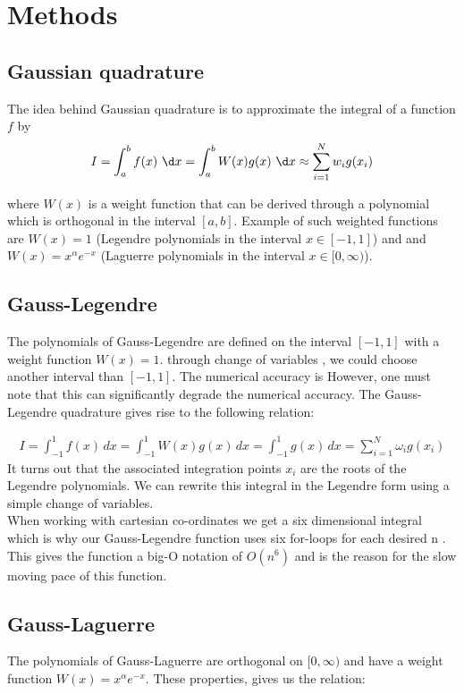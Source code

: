 \documentclass{article}
\begin{document}
\section{Methods}

\subsection{Gaussian quadrature}\label{const_mot}

The idea behind Gaussian quadrature is to approximate the integral of a function $f$ by
\begin{align}
	I = \int_{a}^{b} f(x) \ \d x  = \int_{a}^{b} W(x)g(x) \ \d x \approx \sum_{i=1}^N w_i g(x_i) 
\end{align}

where $W(x)$ is a weight function that can be derived through a polynomial which is orthogonal in the interval $[a, b]$. Example of such weighted functions are $W(x)=1$ (Legendre polynomials in the interval $x\in[-1, 1]$) and and $W(x) = x^\alpha e^{-x}$ (Laguerre polynomials in the interval $x \in [0, \infty)$). 

\subsection{Gauss-Legendre}\label{const_mot}

The polynomials of Gauss-Legendre are defined on the interval $[-1, 1]$ with a weight
function $W(x) = 1$.  through change of variables , we could choose another interval than $[-1, 1]$. The numerical accuracy is However, one must note that this can significantly
degrade the numerical accuracy. The Gauss-Legendre quadrature gives rise to the following
relation:

\begin{align*}
  I = \int_{-1}^{1} f(x) \, dx = \int_{-1}^{1}W(x)g(x)\, dx = \int_{-1}^{1}g(x)
  \, dx = \sum^{N}_{i=1} \omega_ig(x_i)
\end{align*}
It turns out that the associated integration points $x_i$ are the roots of the
Legendre polynomials. We can rewrite this integral in the Legendre form using a simple change of variables.
\\
When working with cartesian co-ordinates we get a six dimensional integral which is why our Gauss-Legendre function uses six for-loops for each desired n . This gives the function a big-O notation of $O(n^6)$ and is the reason for the slow moving pace of this function. 

\subsection{Gauss-Laguerre}\label{const_mot}
The  polynomials of Gauss-Laguerre are orthogonal on $[0, \infty)$ and have a
weight function $W(x) = x^\alpha e^{-x}$. These properties, gives us the relation:\\
\end{document}
